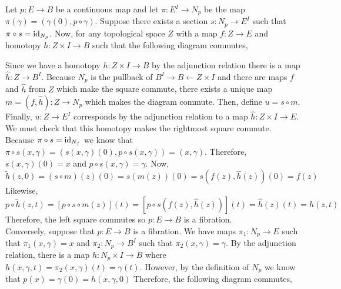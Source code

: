 \documentclass[12pt]{extarticle}
\begin{document}
Let $p : E \to B$ be a continuous map and let $\pi : E^I \to N_p$ be the map $\pi(\gamma) = (\gamma(0), p \circ \gamma)$. Suppose there exists a section $s : N_p \to E^I$ such that $\pi \circ s = \mathrm{id}_{N_p}$. Now, for any topological space $Z$ with a map $f : Z \to E$ and homotopy $h : Z \times I \to B$ such that the following diagram commutes,
\begin{center}
\end{center}
Since we have a homotopy $h : Z \times I \to B$ by the adjunction relation there is a map $\hat{h} : Z \to B^I$. Because $N_p$ is the pullback of $B^I \to B \leftarrow Z \times I$ and there are maps $f$ and $\hat{h}$ from $Z$ which make the square commute, there exists a unique map $m = (f, \hat{h}) : Z \to N_p$ which makes the diagram commute. Then, define $u = s \circ m$. Finally, $u : Z \to E^I$ corresponds by the adjunction relation to a map $\hat{h} : Z \times I \to E$. We must check that this homotopy makes the rightmost square commute. Because $\pi \circ s = \mathrm{id}_{N_f}$ we know that $\pi \circ s(x, \gamma) = (s(x, \gamma)(0), p \circ s(x, \gamma)) = (x, \gamma)$. Therefore, $s(x, \gamma)(0) = x$ and $p \circ s(x, \gamma) = \gamma$. 
Now, 
\[\tilde{h}(z, 0) = (s \circ m)(z)(0) = s(m(z))(0) = s(f(z), \hat{h}(z)) (0) = f(z)\]
Likewise, 
\[p \circ \tilde{h}(z, t) = [p \circ s \circ m(z)](t) = [p  \circ s(f(z), \hat{h}(z))](t) = \hat{h}(z)(t) = h(z, t)\]
Therefore, the left square commutes so $p : E \to B$ is a fibration. \bigskip \\
Conversely, suppose that $p : E \to B$ is a fibration. We have maps $\pi_1 : N_p \to E$ such that $\pi_1(x, \gamma) = x$ and $\pi_2 : N_p \to B^I$ such that $\pi_2(x, \gamma) = \gamma$. By the adjunction relation, there is a map $h : N_p \times I \to B$ where $h(x, \gamma, t) = \pi_2(x, \gamma)(t) = \gamma(t)$. However, by the definition of $N_p$ we know that $p(x) = \gamma(0) = h(x, \gamma, 0)$ Therefore, the following diagram commutes,
\begin{center}
\end{center}   
\end{document}
